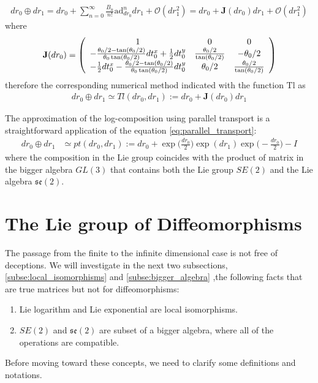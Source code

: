 \begin{align}
dr_{0}\oplus dr_{1}
=
dr_{0}
+
\sum_{n=0}^{\infty} \frac{B_{n}}{n!} \text{ad}_{dr_{0}}^{ n} 
dr_{1}
+
\mathcal{O}(dr_{1}^2)
=
dr_{0}
+
\mathbf{J}(dr_{0})
dr_{1}
+
\mathcal{O}(dr_{1}^2)
\end{align}
where 
\begin{align*}
\mathbf{J}(dr_{0})
=
\left (
\begin{array} {c c c}
1            &  0        &      0
\\
-\frac{\theta_0/2 - \tan(\theta_0/2)}{\theta_0\tan(\theta_0/2)}  dt^{x}_0 + \frac{1}{2}dt^{y}_0       
&  \frac{\theta_0 /2}{\tan(\theta_0/2)} 
& - \theta_0/2 
\\
-  \frac{1}{2} dt^{x}_0 -\frac{\theta_0/2 - \tan(\theta_0/2)}{\theta_0\tan(\theta_0/2)} dt^{y}_0       
& \theta_0/2 
&  \frac{\theta_0 /2}{\tan(\theta_0/2)}
\end{array}
\right )
\end{align*}
therefore the corresponding numerical method indicated with the function $\text{Tl}$ as
\begin{align}\label{eq:taylor_se2}
dr_{0}\oplus dr_{1}
\simeq
Tl(dr_{0}, dr_{1})
:=
dr_{0}
+
\mathbf{J}(dr_{0})
dr_{1}
\end{align}

The approximation of the log-composition using parallel transport is a straightforward application of the equation \ref{eq:parallel_transport}: 
\begin{align}\label{eq:parallel_transport_se2}
dr_{0}\oplus dr_{1}
&\simeq
pt(dr_{0}, dr_{1}) 
:=
dr_{0}
+
\exp\big(\frac{dr_{0}}{2}\big)   
\exp(dr_{1}) 
\exp\big(-\frac{dr_{0}}{2}\big)
-
I
\end{align}
where the composition in the Lie group coincides with the product of matrix in the bigger algebra $GL(3)$ that contains both the Lie group $SE(2)$ and the Lie algebra $\mathfrak{se}(2)$.


\section{The Lie group of Diffeomorphisms}\label{se:svf}


The passage from the finite to the infinite dimensional case is not free of deceptions. We will investigate in the next two subsections, \ref{subse:local_isomorphisms} and \ref{subse:bigger_algebra} ,the following facts that are true matrices but not for diffeomorphisms:
\begin{enumerate}
	\item Lie logarithm and Lie exponential are local isomorphisms.
	\item $SE(2)$ and $\mathfrak{se}(2)$ are subset of a bigger algebra, where all of the operations are compatible.
\end{enumerate}
Before moving toward these concepts, we need to clarify some definitions and notations.

